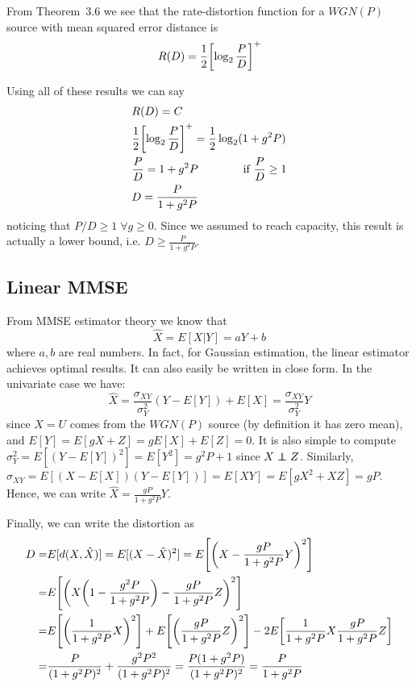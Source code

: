 From Theorem~3.6 we see that the rate-distortion function for a $WGN(P)$ source with mean squared error distance is
%
\begin{equation}
R(D) = \frac{1}{2} \qty[\log_2 \frac{P}{D}]^+
\end{equation}

Using all of these results we can say
%
\begin{align}\label{eq:3.20a_D}
\begin{split}
&R(D)=C\\
&\frac{1}{2} \qty[\log_2 \frac{P}{D}]^+ = \frac{1}{2} \log_2(1+g^2P) \\
&\frac{P}{D} = 1+g^2P \qquad\qquad \mbox{if } \frac{P}{D} \geq 1\\
&D= \frac{P}{1+g^2P}
\end{split}
\end{align}
%
noticing that $P/D \geq 1 \; \forall g \geq 0$. Since we assumed to reach capacity, this result is actually a lower bound, i.e. $D \geq \frac{P}{1+g^2P}$.

\subsection{Linear MMSE}
From MMSE estimator theory we know that
%
\begin{equation}
\hat{X} = E[X|Y] = aY+b
\end{equation}
%
where $a,b$ are real numbers. In fact, for Gaussian estimation, the linear estimator achieves optimal results. It can also easily be written in close form. In the univariate case we have:
%
\begin{equation}
\hat{X} = \frac{\sigma_{XY}}{\sigma_Y^2	} (Y-E[Y]) + E[X] = \frac{\sigma_{XY}}{\sigma_Y^2} Y
\end{equation}
%
since $X=U$ comes from the $WGN(P)$ source (by definition it has zero mean), and $E[Y]=E[gX+Z] = gE[X]+E[Z] = 0$. It is also simple to compute $\sigma_Y^2 = E[(Y-E[Y])^2] = E[Y^2] = g^2P+1$ since $X\independent Z$. Similarly, $\sigma_{XY} = E[(X-E[X])(Y-E[Y])] = E[XY] = E[gX^2+XZ] = gP$.\\
Hence, we can write $\hat{X} = \frac{gP}{1+g^2P}Y$.

Finally, we can write the distortion as
%
\begin{align}
\begin{split}
D =& E[d(X,\hat{X})] = E[(X-\hat{X})^2] = E \qty[\qty(X-\frac{gP}{1+g^2P}Y)^2]\\
=& E \qty[\qty( X \qty(1-\frac{g^2P}{1+g^2P}) - \frac{gP}{1+g^2P}Z)^2]\\
=& E \qty[\qty( \frac{1}{1+g^2P}X)^2] + E\qty[\qty( \frac{gP}{1+g^2P}Z)^2] - 2E\qty[ \frac{1}{1+g^2P}X \frac{gP}{1+g^2P}Z ]\\
=& \frac{P}{(1+g^2P)^2} + \frac{g^2P^2}{(1+g^2P)^2} = \frac{P(1+g^2P)}{(1+g^2P)^2} = \frac{P}{1+g^2P}
\end{split}
\end{align}

